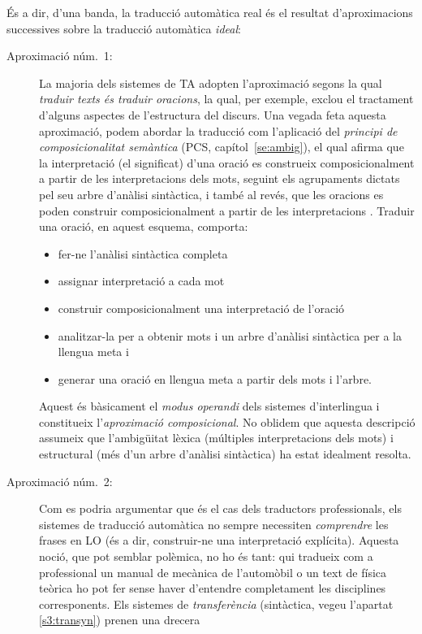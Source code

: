 És a dir, d'una banda, la traducció automàtica real és el resultat
d'aproximacions successives sobre la traducció automàtica \emph{ideal}:
\begin{description}
\item[Aproximació núm.\ 1:] La majoria dels sistemes de TA adopten
  l'aproximació segons la qual \emph{traduir texts és traduir
    oracions}, la qual, per exemple, exclou el tractament d'alguns
  aspectes de l'estructura del discurs. Una vegada feta aquesta
  aproximació, podem abordar la traducció com l'aplicació del
  \emph{principi de composicionalitat semàntica} (PCS,
  capítol~\ref{se:ambig}), el qual afirma que la interpretació (el
  significat) d'una oració es construeix composicionalment a partir de
  les interpretacions dels mots, seguint els agrupaments dictats pel
  seu arbre d'anàlisi sintàctica, i també al revés, que les oracions
  es poden construir composicionalment a partir de les interpretacions
  \citep{tellier00p}. Traduir una oració, en aquest esquema, comporta:
  \begin{itemize}
  \item fer-ne l'anàlisi sintàctica completa
  \item assignar interpretació a cada mot
  \item construir composicionalment una interpretació de l'oració
  \item analitzar-la per a obtenir mots i un arbre d'anàlisi
    sintàctica per a la llengua meta i
  \item generar una oració en llengua meta a partir dels mots i
    l'arbre.
  \end{itemize}
  Aquest és bàsicament el \emph{modus
    operandi} dels sistemes d'interlingua i constitueix
    l'\emph{aproximació composicional}. No oblidem que aquesta
    descripció assumeix que l'ambigüitat lèxica (múltiples
    interpretacions dels mots) i estructural (més d'un arbre d'anàlisi
    sintàctica) ha estat
    idealment resolta.
  \item[Aproximació núm.\ 2:] Com es podria argumentar que és el cas
    dels traductors professionals, els sistemes de traducció
    automàtica no sempre necessiten \emph{comprendre} les frases en LO
    (és a dir, construir-ne una interpretació explícita). Aquesta
    noció, que pot semblar polèmica, no ho és tant: qui tradueix com a
    professional un manual de mecànica de l'automòbil o un text de
    física teòrica ho pot fer sense haver d'entendre completament les
    disciplines corresponents. Els sistemes de \emph{transferència}
    (sintàctica, vegeu l'apartat \ref{s3:transyn}) prenen una drecera

\end{description}
